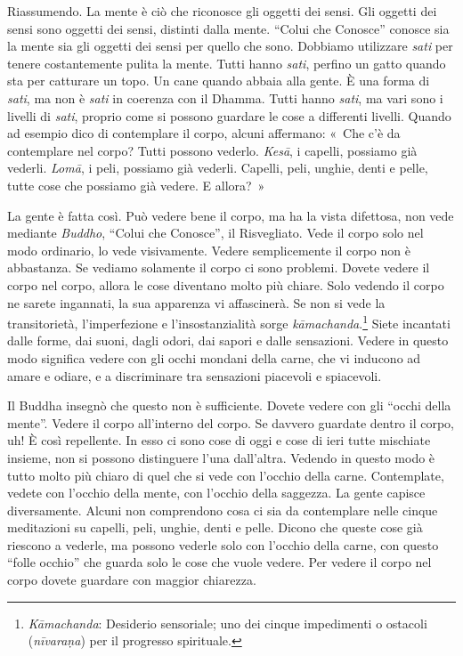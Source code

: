 Riassumendo. La mente è ciò che riconosce gli oggetti dei sensi. Gli
oggetti dei sensi sono oggetti dei sensi, distinti dalla mente. ``Colui
che Conosce'' conosce sia la mente sia gli oggetti dei sensi per quello
che sono. Dobbiamo utilizzare \emph{sati} per tenere costantemente
pulita la mente. Tutti hanno \emph{sati}, perfino un gatto quando sta
per catturare un topo. Un cane quando abbaia alla gente. È una forma di
\emph{sati}, ma non è \emph{sati} in coerenza con il Dhamma. Tutti hanno
\emph{sati}, ma vari sono i livelli di \emph{sati}, proprio come si
possono guardare le cose a differenti livelli. Quando ad esempio dico di
contemplare il corpo, alcuni affermano: «~Che c'è da contemplare nel
corpo? Tutti possono vederlo. \emph{Kesā}, i capelli, possiamo già
vederli. \emph{Lomā}, i peli, possiamo già vederli. Capelli, peli,
unghie, denti e pelle, tutte cose che possiamo già vedere. E allora?~»

La gente è fatta così. Può vedere bene il corpo, ma ha la vista
difettosa, non vede mediante \emph{Buddho}, ``Colui che Conosce'', il
Risvegliato. Vede il corpo solo nel modo ordinario, lo vede visivamente.
Vedere semplicemente il corpo non è abbastanza. Se vediamo solamente il
corpo ci sono problemi. Dovete vedere il corpo nel corpo, allora le cose
diventano molto più chiare. Solo vedendo il corpo ne sarete ingannati,
la sua apparenza vi affascinerà. Se non si vede la transitorietà,
l'imperfezione e l'insostanzialità sorge \emph{kāmachanda}.\footnote{\emph{Kāmachanda}:
  Desiderio sensoriale; uno dei cinque impedimenti o ostacoli
  (\emph{nīvaraṇa}) per il progresso spirituale.} Siete incantati dalle
forme, dai suoni, dagli odori, dai sapori e dalle sensazioni. Vedere in
questo modo significa vedere con gli occhi mondani della carne, che vi
inducono ad amare e odiare, e a discriminare tra sensazioni piacevoli e
spiacevoli.

Il Buddha insegnò che questo non è sufficiente. Dovete vedere con gli
``occhi della mente''. Vedere il corpo all'interno del corpo. Se davvero
guardate dentro il corpo, uh! È così repellente. In esso ci sono cose di
oggi e cose di ieri tutte mischiate insieme, non si possono distinguere
l'una dall'altra. Vedendo in questo modo è tutto molto più chiaro di
quel che si vede con l'occhio della carne. Contemplate, vedete con
l'occhio della mente, con l'occhio della saggezza. La gente capisce
diversamente. Alcuni non comprendono cosa ci sia da contemplare nelle
cinque meditazioni su capelli, peli, unghie, denti e pelle. Dicono che
queste cose già riescono a vederle, ma possono vederle solo con l'occhio
della carne, con questo ``folle occhio'' che guarda solo le cose che
vuole vedere. Per vedere il corpo nel corpo dovete guardare con maggior
chiarezza.

